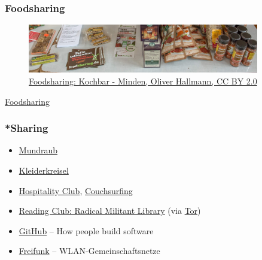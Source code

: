 \begin{frame}
	\frametitle{Foodsharing}

	\begin{figure}
		\includegraphics[width=0.9\textwidth]{img/foodsharing-cut.jpg}
		\caption[Foodsharing by Oliver Hallmann, Ausschnitt]{\href{https://flic.kr/p/kCmbVx}{{Foodsharing: Kochbar - Minden}, Oliver Hallmann, CC BY 2.0}}
	\end{figure}

	\href{https://foodsharing.de/}{Foodsharing}
\end{frame}

\begin{frame}
	\frametitle{*Sharing}

	\begin{itemize}
		\item \href{http://mundraub.org/}{Mundraub}
		\item \href{https://www.kleiderkreisel.de/}{Kleiderkreisel}
		\item \href{http://www.hospitalityclub.org/}{Hospitality Club}, \href{http://couchsurfing.org/}{Couchsurfing}
		\item \href{http://c3jemx2ube5v5zpg.onion/}{Reading Club: Radical Militant Library} (via \href{https://www.torproject.org/}{Tor})
		\item \href{https://github.com/}{GitHub} – How people build software
		\item \href{https://freifunk.net//}{Freifunk} – WLAN-Gemeinschaftsnetze
	\end{itemize}
\end{frame}
